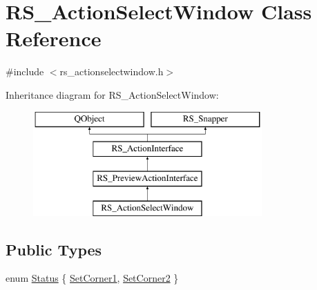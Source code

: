 \hypertarget{classRS__ActionSelectWindow}{\section{R\-S\-\_\-\-Action\-Select\-Window Class Reference}
\label{classRS__ActionSelectWindow}
}


{\ttfamily \#include $<$rs\-\_\-actionselectwindow.\-h$>$}

Inheritance diagram for R\-S\-\_\-\-Action\-Select\-Window\-:\begin{figure}[H]
\begin{center}
\leavevmode
\includegraphics[height=4.000000cm]{classRS__ActionSelectWindow}
\end{center}
\end{figure}
\subsection*{Public Types}
\begin{DoxyCompactItemize}
\item 
enum \hyperlink{classRS__ActionSelectWindow_acd8501ba25ea7ecd309abd9f61aba16d}{Status} \{ \hyperlink{classRS__ActionSelectWindow_acd8501ba25ea7ecd309abd9f61aba16dac0bd301f46757a65911f9a2e2d144040}{Set\-Corner1}, 
\hyperlink{classRS__ActionSelectWindow_acd8501ba25ea7ecd309abd9f61aba16da99998b6293b0cfab501f22ee5dd1dd51}{Set\-Corner2}
 \}
\end{DoxyCompactItemize}
